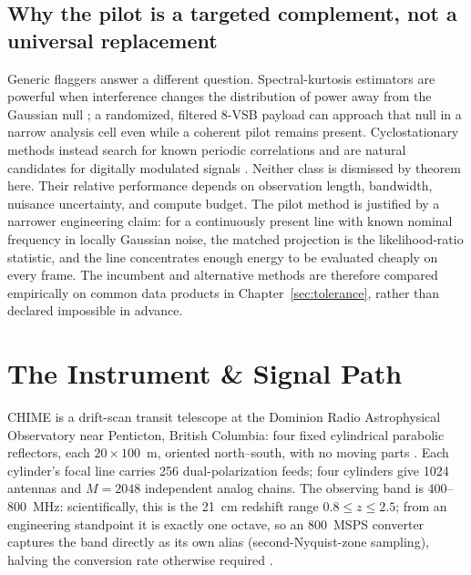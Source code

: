 \subsection*{Why the pilot is a targeted complement, not a universal replacement}

Generic flaggers answer a different question. Spectral-kurtosis estimators are powerful when interference changes the distribution of power away from the Gaussian null \cite{nita2010sk}; a randomized, filtered 8-VSB payload can approach that null in a narrow analysis cell even while a coherent pilot remains present. Cyclostationary methods instead search for known periodic correlations and are natural candidates for digitally modulated signals \cite{gardner1991}. Neither class is dismissed by theorem here. Their relative performance depends on observation length, bandwidth, nuisance uncertainty, and compute budget. The pilot method is justified by a narrower engineering claim: for a continuously present line with known nominal frequency in locally Gaussian noise, the matched projection is the likelihood-ratio statistic, and the line concentrates enough energy to be evaluated cheaply on every frame. The incumbent and alternative methods are therefore compared empirically on common data products in Chapter~\ref{sec:tolerance}, rather than declared impossible in advance.

\section{The Instrument \& Signal Path}
\label{sec:system:instrument}
CHIME is a drift-scan transit telescope at the Dominion Radio Astrophysical Observatory near Penticton, British Columbia: four fixed cylindrical parabolic reflectors, each $20 \times 100$~m, oriented north--south, with no moving parts \cite{amiri2022chime}. Each cylinder's focal line carries 256 dual-polarization feeds; four cylinders give 1024 antennas and $M = 2048$ independent analog chains. The observing band is 400--800~MHz: scientifically, this is the 21~cm redshift range $0.8 \le z \le 2.5$; from an engineering standpoint it is exactly one octave, so an 800~MSPS converter captures the band directly as its own alias (second-Nyquist-zone sampling), halving the conversion rate otherwise required \cite{amiri2022chime}.

